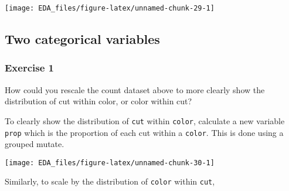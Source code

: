 \documentclass[]{book}
\newenvironment{Shaded}{\begin{snugshade}}{\end{snugshade}}
\newcommand{\DataTypeTok}[1]{\textcolor[rgb]{0.13,0.29,0.53}{#1}}
\newcommand{\DecValTok}[1]{\textcolor[rgb]{0.00,0.00,0.81}{#1}}
\newcommand{\KeywordTok}[1]{\textcolor[rgb]{0.13,0.29,0.53}{\textbf{#1}}}
\newcommand{\NormalTok}[1]{#1}
\newcommand{\OperatorTok}[1]{\textcolor[rgb]{0.81,0.36,0.00}{\textbf{#1}}}
\newcommand{\StringTok}[1]{\textcolor[rgb]{0.31,0.60,0.02}{#1}}
\theoremstyle{definition}
\theoremstyle{definition}
\theoremstyle{definition}
\theoremstyle{remark}
\begin{document}
\begin{center}\texttt{[image: EDA\_files/figure-latex/unnamed-chunk-29-1]} \end{center}

\hypertarget{two-categorical-variables}{%
\subsection{Two categorical variables}\label{two-categorical-variables}}

\hypertarget{exercise-1-11}{%
\subsubsection{Exercise 1}\label{exercise-1-11}}

How could you rescale the count dataset above to more clearly show the
distribution of cut within color, or color within cut?

To clearly show the distribution of \texttt{cut} within \texttt{color},
calculate a new variable \texttt{prop} which is the proportion of each
cut within a \texttt{color}. This is done using a grouped mutate.

\begin{Shaded}
\end{Shaded}

\begin{center}\texttt{[image: EDA\_files/figure-latex/unnamed-chunk-30-1]} \end{center}

Similarly, to scale by the distribution of \texttt{color} within
\texttt{cut},
\end{document}
